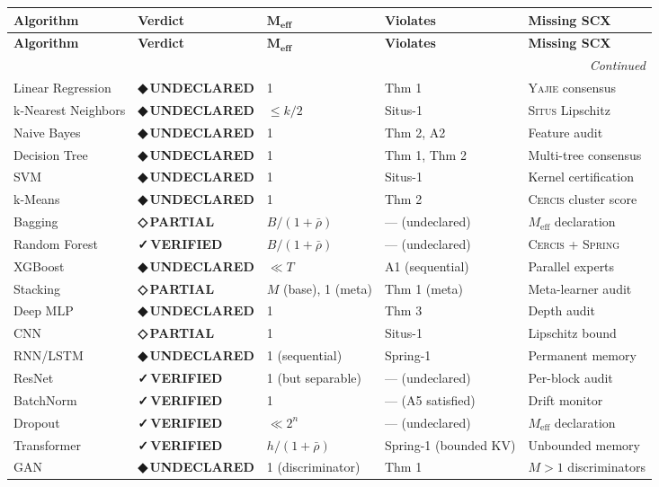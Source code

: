 \documentclass[12pt,a4paper]{article}
\theoremstyle{definition}
\newcommand{\guilty}{{\color{guiltycolor}\textbf{◆\,UNDECLARED}}}
\newcommand{\weakness}{{\color{weakcolor}\textbf{◇\,PARTIAL}}}
\newcommand{\verified}{{\color{verifiedcolor}\textbf{✓\,VERIFIED}}}
\newcommand{\Situs}{\textsc{Situs}}
\newcommand{\Yajie}{\textsc{Yajie}}
\newcommand{\Spring}{\textsc{Spring}}
\newcommand{\Cercis}{\textsc{Cercis}}
\begin{document}
\begin{longtable}{p{3.2cm} p{1.2cm} p{1.2cm} p{2cm} p{3cm}}
\toprule
\textbf{Algorithm} & \textbf{Verdict} & $\boldsymbol{M_{\textbf{eff}}}$ & \textbf{Violates} & \textbf{Missing SCX} \\
\midrule
\endfirsthead
\toprule
\textbf{Algorithm} & \textbf{Verdict} & $\boldsymbol{M_{\textbf{eff}}}$ & \textbf{Violates} & \textbf{Missing SCX} \\
\midrule
\endhead
\midrule
\multicolumn{5}{r}{\textit{Continued}} \\
\endfoot
\bottomrule
\endlastfoot
Linear Regression & \guilty{} & 1 & Thm 1 & \Yajie{} consensus \\
k-Nearest Neighbors & \guilty{} & $\le k/2$ & Situs-1 & \Situs{} Lipschitz \\
Naive Bayes & \guilty{} & 1 & Thm 2, A2 & Feature audit \\
Decision Tree & \guilty{} & 1 & Thm 1, Thm 2 & Multi-tree consensus \\
SVM & \guilty{} & 1 & Situs-1 & Kernel certification \\
k-Means & \guilty{} & 1 & Thm 2 & \Cercis{} cluster score \\
Bagging & \weakness{} & $B/(1+\bar{\rho})$ & — (undeclared) & $M_{\text{eff}}$ declaration \\
Random Forest & \verified{} & $B/(1+\bar{\rho})$ & — (undeclared) & \Cercis{} + \Spring{} \\
XGBoost & \guilty{} & $\ll T$ & A1 (sequential) & Parallel experts \\
Stacking & \weakness{} & $M$ (base), 1 (meta) & Thm 1 (meta) & Meta-learner audit \\
Deep MLP & \guilty{} & 1 & Thm 3 & Depth audit \\
CNN & \weakness{} & 1 & Situs-1 & Lipschitz bound \\
RNN/LSTM & \guilty{} & 1 (sequential) & Spring-1 & Permanent memory \\
ResNet & \verified{} & 1 (but separable) & — (undeclared) & Per-block audit \\
BatchNorm & \verified{} & 1 & — (A5 satisfied) & Drift monitor \\
Dropout & \verified{} & $\ll 2^n$ & — (undeclared) & $M_{\text{eff}}$ declaration \\
Transformer & \verified{} & $h/(1+\bar{\rho})$ & Spring-1 (bounded KV) & Unbounded memory \\
GAN & \guilty{} & 1 (discriminator) & Thm 1 & $M>1$ discriminators \\

\end{longtable}
\end{document}
